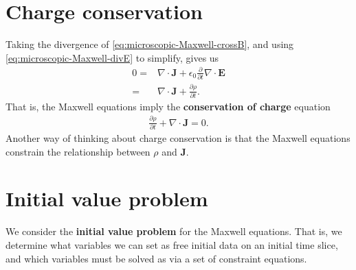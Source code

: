 \documentclass[12pt]{report}
\newcommand{\bE}{{\bm E}}
\newcommand{\bJ}{{\bm J}}
\begin{document}
\section{Charge conservation}

Taking the divergence of \eqref{eq:microscopic-Maxwell-crossB}, and using \eqref{eq:microscopic-Maxwell-divE} to simplify, gives us 
\begin{align}
    0
    =&
    \nabla\cdot\bJ
    +
    \epsilon_0\frac{\partial}{\partial t}\nabla\cdot \bE
    \nonumber \\
    =&
    \nabla\cdot\bJ
    +
    \frac{\partial\rho}{\partial t}
    .
\end{align}
That is, the Maxwell equations imply the \textbf{conservation of charge} equation
\begin{align}
    \label{eq:conservation-of-charge}
    \frac{\partial\rho}{\partial t}
    +
    \nabla\cdot\bJ
    =
    0
    .
\end{align}
Another way of thinking about charge conservation is that the Maxwell equations constrain the relationship between $\rho$ and $\bJ$. 

\section{Initial value problem}

We consider the \textbf{initial value problem} for the Maxwell equations.
That is, we determine what variables we can set as free initial data on an initial time slice, and which variables must be solved as via a set of constraint equations. 
\end{document}

